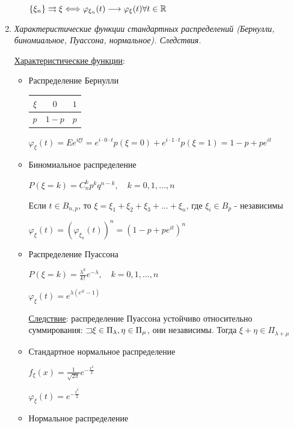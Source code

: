 \documentclass[12pt]{article}
\begin{document}
\begin{enumerate}
\begin{enumerate}
        $\{\xi_n\} \rightrightarrows \xi \Longleftrightarrow \varphi_{\xi_n}(t) \longrightarrow \varphi_\xi(t) \forall t \in \mathbb{R}$
    \end{enumerate}

    \item \textit{Характеристические функции стандартных распределений (Бернулли, биномиальное, Пуассона, нормальное). Следствия.}

    \hyperlink{characteristicfunctionofstandarddistributions}{Характеристические функции}: 

    \begin{itemize}
        \item Распределение Бернулли

        \begin{tabular}{c|c|c}
            $\xi$ & $0$     & $1$    \\
            \hline
            $p$   & $1 - p$ & $p$
        \end{tabular} \qquad\qquad $\varphi_\xi(t) = Ee^{i\xi t} = e^{i \cdot 0 \cdot t} p(\xi = 0) + e^{i \cdot 1 \cdot t} p(\xi = 1) = 1 - p + p e^{it}$

        \item Биномиальное распределение

        $P(\xi = k) = C_n^k p^k q^{n - k}, \quad k = 0, 1, \dots, n$

        Если $t \in B_{n,p}$, то $\xi = \xi_1 + \xi_2 + \xi_3 + \dots + \xi_n$, где $\xi_i \in B_p$ - независимы

        $\varphi_\xi(t) = (\varphi_{\xi_n}(t))^n = (1 - p + p e^{it})^n$

        \item Распределение Пуассона

        $P(\xi = k) = \frac{\lambda^k}{k!} e^{-\lambda}, \quad k = 0, 1, \dots, n$

        $\varphi_\xi(t) = e^{\lambda (e^{it} - 1)}$

        \underline{Следствие}: распределение Пуассона устойчиво относительно суммирования: $\mathord{\sqsupset} \xi \in \Pi_\lambda, \eta \in \Pi_\mu$, они независимы. Тогда $\xi + \eta \in \Pi_{\lambda + \mu}$

        \item Стандартное нормальное распределение

        $f_\xi(x) = \frac{1}{\sqrt{2\pi}} e^{-\frac{x^2}{2}}$

        $\varphi_\xi(t) = e^{-\frac{t^2}{2}}$

        \item Нормальное распределение


\end{itemize}
\end{enumerate}
\end{document}
